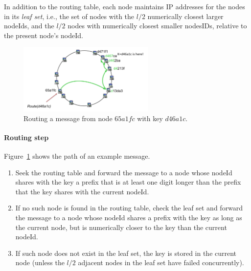 \documentclass[a4paper,12pt]{article}
\begin{document}
In addition to the routing table, each node maintains IP addresses for the nodes in its \textit{leaf set}, i.e., the set of nodes with the $l/2$ numerically closest larger nodeIds, and the $l/2$ nodes with numerically closest smaller nodesIDs, relative to the present node's nodeId.

\begin{figure}[b]
  \centering
  \includegraphics[width=0.6\textwidth]{img/routing-step}
  \caption{\label{fig:routing-step} Routing a message from node $65a1fc$ with key $d46a1c$.}
\end{figure}

\paragraph{Routing step}
Figure~\ref{fig:routing-step} shows the path of an example message.
\begin{enumerate}[label=\arabic*.]
  \item Seek the routing table and forward the message to a node whose nodeId shares with the key a prefix that is at least one digit longer than the prefix that the key shares with the current nodeId.
  \item If no such node is found in the routing table, check the leaf set and forward the message to a node whose nodeId shares a prefix with the key as long as the current node, but is numerically closer to the key than the current nodeId.
  \item If such node does not exist in the leaf set, the key is stored in the current node (unless the $l/2$ adjacent nodes in the leaf set have failed concurrently).
\end{enumerate}
\end{document}
